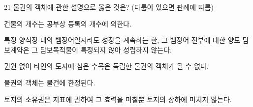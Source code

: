 \begin{question}{21}
물권의 객체에 관한 설명으로 옳은 것은? (다툼이 있으면 판례에 따름)
\begin{choices}
  \item 건물의 개수는 공부상 등록의 개수에 의한다.
  \item 특정 양식장 내의 뱀장어일지라도 성장을 계속하는 한, 그 뱀장어 전부에 대한 양도 담보계약은 그 담보목적물이 특정되지 않아 성립하지 않는다.
  \item 권원 없이 타인의 토지에 심은 수목은 독립한 물권의 객체가 될 수 없다.
  \item 물권의 객체는 물건에 한정된다.
  \item 토지의 소유권은 지표에 관하여 그 효력을 미칠뿐 토지의 상하에 미치지 않는다.
\end{choices}
\end{question}
